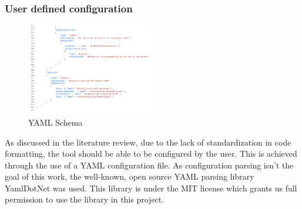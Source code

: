 \newpage

\subsubsection{User defined configuration}

\begin{figure}
    \centering
    \caption{YAML Schema}
    \label{fig:YAMLSchema}
    \includegraphics[width=0.5\textwidth]{Figures/YAMLSchemaCropped.png}
\end{figure}


As discussed in the literature review, due to the lack of standardization in code formatting, the tool should be able to be configured by the user. This is achieved through the use of a YAML configuration file. As configuration parsing isn't the goal of this work, the well-known, open source YAML parsing library YamlDotNet was used. This library is under the MIT license which grants us full permission to use the library in this project.


